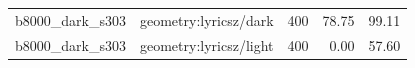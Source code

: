 \begin{longtable}{l>{\raggedright\arraybackslash}p{.42\linewidth}rrr}
b8000\_\allowbreak{}dark\_\allowbreak{}s303 & %
geometry:lyricsz/dark & %
400 & %
78.75 & %
99.11 \\ %

b8000\_\allowbreak{}dark\_\allowbreak{}s303 & %
geometry:lyricsz/light & %
400 & %
0.00 & %
57.60 \\ %


\end{longtable}
